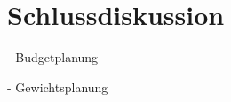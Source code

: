 \documentclass[main.tex]{subfiles} %
\begin{document}
\section{Schlussdiskussion}

- Budgetplanung

- Gewichtsplanung

% 

% 


\newpage


\newpage


\newpage
\end{document}
